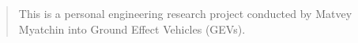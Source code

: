 \documentclass[12pt]{article}
\begin{document}
\begin{abstract}
    This is a personal engineering research project conducted by Matvey Myatchin into Ground Effect Vehicles (GEVs).
\end{abstract}
\end{document}
